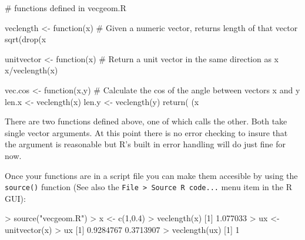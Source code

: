 \begin{R}
# functions defined in vecgeom.R

veclength <- function(x) {
  # Given a numeric vector, returns length of that vector
  sqrt(drop(x %
}

unitvector <- function(x) {
  # Return a unit vector in the same direction as x
  x/veclength(x)
}

vec.cos <- function(x,y) {
  # Calculate the cos of the angle between vectors x and y
  len.x <- veclength(x)
  len.y <- veclength(y)
  return( (x %
}

\end{R}
There are two functions defined above, one of which calls the other.
Both take single vector arguments. At this point there is no error
checking to insure that the argument is reasonable but R's built in
error handling will do just fine for now.

Once your functions are in a script file you can make them accesible by
using the \lstinline!source()! function (See also the
\lstinline!File > Source R code...! menu item in the R GUI):
%
\begin{R}
> source("vecgeom.R")
> x <- c(1,0.4)
> veclength(x)
[1] 1.077033
> ux <- unitvector(x)
> ux
[1] 0.9284767 0.3713907
> veclength(ux)
[1] 1
\end{R}

